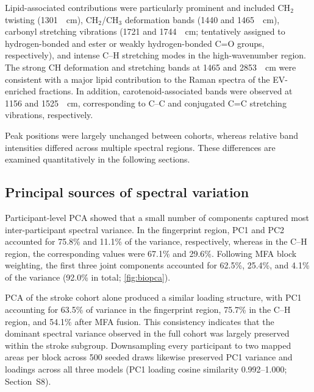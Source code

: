 \documentclass[preprint,12pt]{elsarticle}
\begin{document}
Lipid-associated contributions were particularly prominent and included CH$_2$ twisting (1301~\si{\per\centi\metre}), CH$_2$/CH$_3$ deformation bands (1440 and 1465~\si{\per\centi\metre}), carbonyl stretching vibrations (1721 and 1744~\si{\per\centi\metre}; tentatively assigned to hydrogen-bonded and ester or weakly hydrogen-bonded C=O groups, respectively), and intense C--H stretching modes in the high-wavenumber region. The strong CH deformation and stretching bands at 1465 and 2853~\si{\per\centi\metre} were consistent with a major lipid contribution to the Raman spectra of the EV-enriched fractions. In addition, carotenoid-associated bands were observed at 1156 and 1525~\si{\per\centi\metre}, corresponding to C--C and conjugated C=C stretching vibrations, respectively.

Peak positions were largely unchanged between cohorts, whereas relative band intensities differed across multiple spectral regions. These differences are examined quantitatively in the following sections.


\subsection{Principal sources of spectral variation}
\label{subsec:biopca_results}

Participant-level PCA showed that a small number of components captured most inter-participant spectral variance. In the fingerprint region, PC1 and PC2 accounted for 75.8\% and 11.1\% of the variance, respectively, whereas in the C--H region, the corresponding values were 67.1\% and 29.6\%. Following MFA block weighting, the first three joint components accounted for 62.5\%, 25.4\%, and 4.1\% of the variance (92.0\% in total; \cref{fig:biopca}).

PCA of the stroke cohort alone produced a similar loading structure, with PC1 accounting for 63.5\% of variance in the fingerprint region, 75.7\% in the C--H region, and 54.1\% after MFA fusion. This consistency indicates that the dominant spectral variance observed in the full cohort was largely preserved within the stroke subgroup. Downsampling every participant to two mapped areas per block across 500 seeded draws likewise preserved PC1 variance and loadings across all three models (PC1 loading cosine similarity 0.992--1.000; Section~S8).
\end{document}
